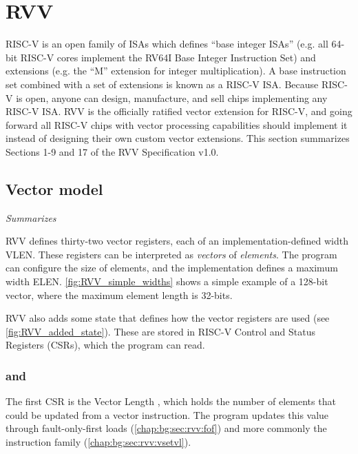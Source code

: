 \section{RVV}\label{chap:bg:sec:rvv}
RISC-V is an open family of ISAs which defines ``base integer ISAs'' (e.g. all 64-bit RISC-V cores implement the RV64I Base Integer Instruction Set) and extensions (e.g. the ``M'' extension for integer multiplication).
A base instruction set combined with a set of extensions is known as a RISC-V ISA.
Because RISC-V is open, anyone can design, manufacture, and sell chips implementing any RISC-V ISA.
RVV is the officially ratified vector extension for RISC-V, and going forward all RISC-V chips with vector processing capabilities should implement it instead of designing their own custom vector extensions.
This section summarizes Sections 1-9 and 17 of the RVV Specification v1.0\cite{RISCVVectorExtension2021}.

\subsection{Vector model}\label{chap:bg:sec:rvv:vector_model}
\emph{Summarizes \cite[Sections 1-4]{RISCVVectorExtension2021}}




RVV defines thirty-two vector registers, each of an implementation-defined width VLEN.
These registers can be interpreted as \emph{vectors} of \emph{elements}.
The program can configure the size of elements, and the implementation defines a maximum width ELEN.
\cref{fig:RVV_simple_widths} shows a simple example of a 128-bit vector, where the maximum element length is 32-bits.


RVV also adds some state that defines how the vector registers are used (see \cref{fig:RVV_added_state}).
These are stored in RISC-V Control and Status Registers (CSRs), which the program can read.

\subsubsection{ and }\label{chap:bg:sec:rvv:vstart}
The first CSR is the Vector Length , which holds the number of elements that could be updated from a vector instruction.
The program updates this value through fault-only-first loads (\cref{chap:bg:sec:rvv:fof}) and more commonly the  instruction family (\cref{chap:bg:sec:rvv:vsetvl}).

